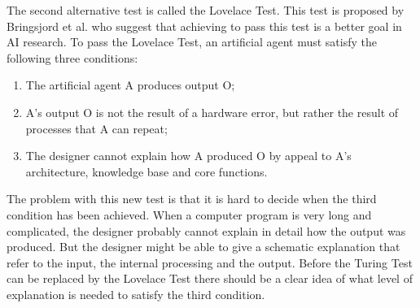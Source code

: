 The second alternative test is called the Lovelace Test. This test is proposed by Bringsjord et al. who suggest that achieving to pass this test is a better goal in AI research. To pass the Lovelace Test, an artificial agent must satisfy the following three conditions:

\begin{enumerate}
   \item The artificial agent A produces output O;
   \item A's output O is not the result of a hardware error, but rather the result of processes that A can repeat;
   \item The designer cannot explain how A produced O by appeal to A's architecture, knowledge base and core functions.
\end{enumerate}

The problem with this new test is that it is hard to decide when the third condition has been achieved. When a computer program is very long and complicated, the designer probably cannot explain in detail how the output was produced. But the designer might be able to give a schematic explanation that refer to the input, the internal processing and the output. Before the Turing Test can be replaced by the Lovelace Test there should be a clear idea of what level of explanation is needed to satisfy the third condition.


